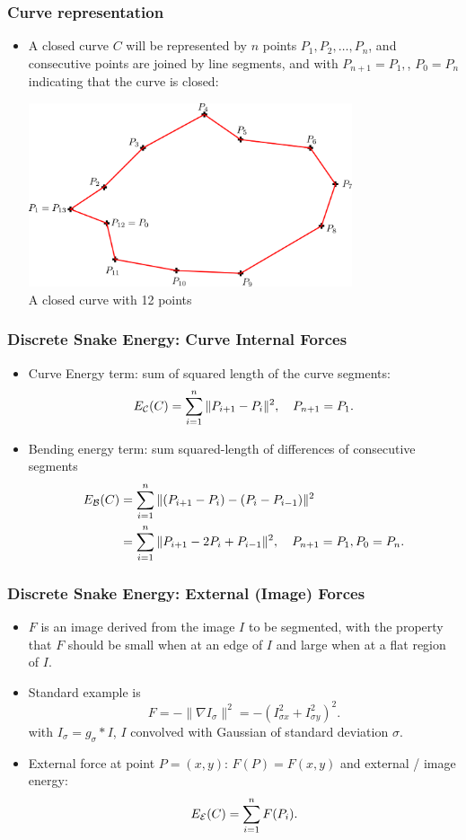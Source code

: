 \documentclass[10pt]{beamer}
\begin{document}
\begin{frame}
  \frametitle{Curve representation}
  \begin{itemize}
  \item A closed curve $C$ will be represented by $n$ points $P_1,P_2,\dots,P_n$, and consecutive points are joined
    by line segments, and with $P_{n+1} = P_1,$, $P_0=P_n$ indicating that the curve is closed: 
    \begin{center}
      \includegraphics[width=0.75\textwidth]{FIGURES/closedcurvepoints}\\
      A closed curve with 12 points
    \end{center}
  \end{itemize}
\end{frame}


\begin{frame}
  \frametitle{Discrete Snake Energy: Curve Internal Forces}
  \begin{itemize}
  \item Curve Energy term: sum of squared length of the curve segments:
    $$
    E_{\mathcal C}(C) = \sum_{i=1}^n\|P_{i+1}-P_i\|^2,\quad P_{n+1} = P_1.
    $$
  \item Bending energy term: sum squared-length of  differences of consecutive segments
    \begin{align*}
      E_{\mathcal B}(C) &= \sum_{i=1}^n\| (P_{i+1}-P_i) - (P_i-P_{i-1})\|^2\\
      &=\sum_{i=1}^n\| P_{i+1}-2P_i+P_{i-1}\|^2,\quad P_{n+1} = P_1, P_0 = P_n.
    \end{align*}
  \end{itemize}
\end{frame}


\begin{frame}
   \frametitle{Discrete Snake Energy: External (Image) Forces}
   \begin{itemize}
   \item
     $F$ is an image derived from the image $I$ to be segmented, with the property that
     $F$ should be small when at an edge of $I$ and large when at a flat region of $I$. 
   \item Standard example is 
     $$
     F = -\|\nabla I_\sigma\|^2 = -\left(I_{\sigma x}^2 + I_{\sigma y}^2\right)^2.
     $$
     with $I_\sigma = g_\sigma\ast I$, $I$ convolved with Gaussian of standard deviation $\sigma$.
   \item External force at point $P = (x,y)$: $F(P) = F(x,y)$ and external / image energy:
     $$
     E_{\mathcal E}(C) = \sum_{i=1}^n F(P_i).
     $$
   \end{itemize}
 \end{frame}
\end{document}
